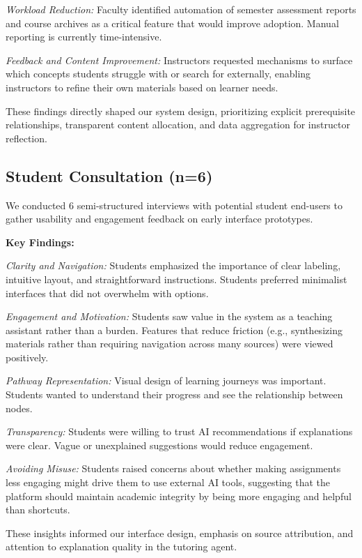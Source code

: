 \documentclass{stylefiles/capstone}
\begin{document}
\textit{Workload Reduction:} Faculty identified automation of semester assessment reports and course archives as a critical feature that would improve adoption. Manual reporting is currently time-intensive.

\textit{Feedback and Content Improvement:} Instructors requested mechanisms to surface which concepts students struggle with or search for externally, enabling instructors to refine their own materials based on learner needs.

These findings directly shaped our system design, prioritizing explicit prerequisite relationships, transparent content allocation, and data aggregation for instructor reflection.

\subsection{Student Consultation (n=6)}

We conducted 6 semi-structured interviews with potential student end-users to gather usability and engagement feedback on early interface prototypes.

\textbf{Key Findings:}

\textit{Clarity and Navigation:} Students emphasized the importance of clear labeling, intuitive layout, and straightforward instructions. Students preferred minimalist interfaces that did not overwhelm with options.

\textit{Engagement and Motivation:} Students saw value in the system as a teaching assistant rather than a burden. Features that reduce friction (e.g., synthesizing materials rather than requiring navigation across many sources) were viewed positively.

\textit{Pathway Representation:} Visual design of learning journeys was important. Students wanted to understand their progress and see the relationship between nodes.

\textit{Transparency:} Students were willing to trust AI recommendations if explanations were clear. Vague or unexplained suggestions would reduce engagement.

\textit{Avoiding Misuse:} Students raised concerns about whether making assignments less engaging might drive them to use external AI tools, suggesting that the platform should maintain academic integrity by being more engaging and helpful than shortcuts.

These insights informed our interface design, emphasis on source attribution, and attention to explanation quality in the tutoring agent.
\end{document}
